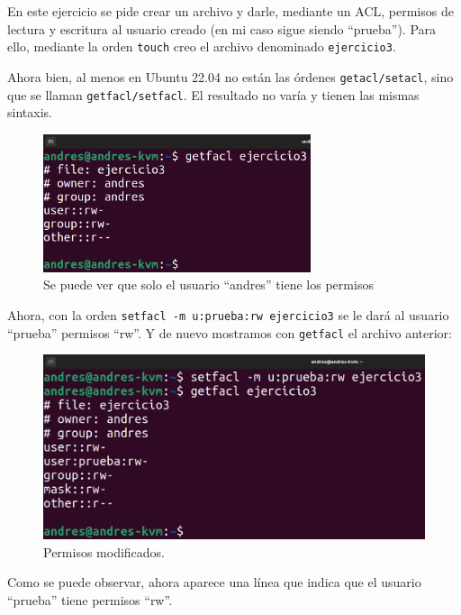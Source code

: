 \documentclass{article}
\begin{document}
\bigskip

En este ejercicio se pide crear un archivo y darle, mediante un ACL, permisos de lectura y escritura al usuario creado (en mi caso sigue siendo ``prueba''). Para ello, mediante la orden \verb|touch| creo el archivo denominado \verb|ejercicio3|.

\bigskip

Ahora bien, al menos en Ubuntu 22.04 no están las órdenes \verb|getacl/setacl|, sino que se llaman \verb|getfacl/setfacl|. El resultado no varía y tienen las mismas sintaxis.

\begin{figure}[H]
    \centering
    \includegraphics[width=0.7\textwidth]{imagenes/getfaclorg.png}
    \caption{Se puede ver que solo el usuario ``andres'' tiene los permisos}
\end{figure}


Ahora, con la orden \verb|setfacl -m u:prueba:rw ejercicio3| se le dará al usuario ``prueba'' permisos ``rw''. Y de nuevo mostramos con \verb|getfacl| el archivo anterior:

\begin{figure}[H]
    \centering
    \includegraphics[width=\textwidth]{imagenes/getfaclnew.png}
    \caption{Permisos modificados.}
\end{figure}

Como se puede observar, ahora aparece una línea que indica que el usuario ``prueba'' tiene permisos ``rw''.
\end{document}
